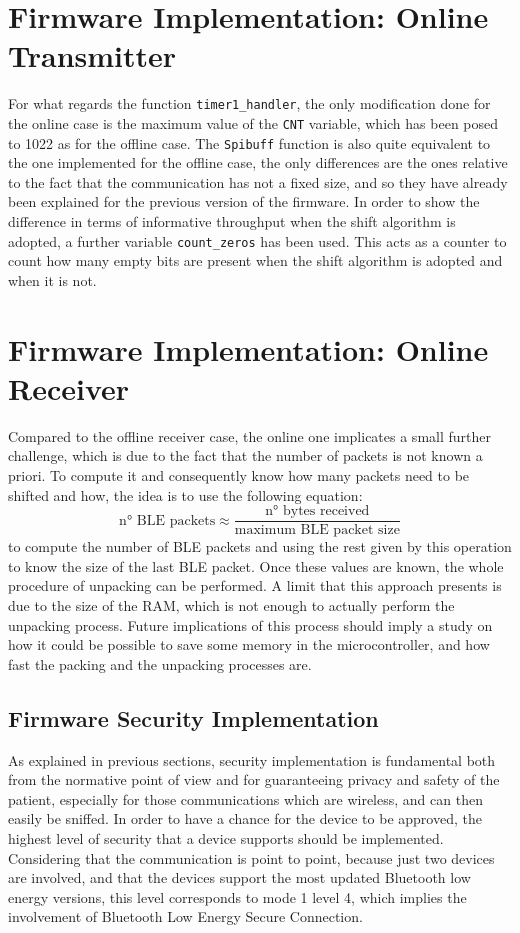 \documentclass{Configuration_Files/PoliMi3i_thesis}
\begin{document}
\section{Firmware Implementation: Online Transmitter}

For what regards the function \texttt{timer1\_handler}, the only modification done for the online case is the maximum value of the \texttt{CNT} variable, which has been posed to 1022 as for the offline case. The \texttt{Spibuff} function is also quite equivalent to the one implemented for the offline case, the only differences are the ones relative to the fact that the communication has not a fixed size, and so they have already been explained for the previous version of the firmware. In order to show the difference in terms of informative throughput when the shift algorithm is adopted, a further variable \texttt{count\_zeros} has been used. This acts as a counter to count how many empty bits are present when the shift algorithm is adopted and when it is not.

\section{Firmware Implementation: Online Receiver}

Compared to the offline receiver case, the online one implicates a small further challenge, which is due to the fact that the number of packets is not known a priori. To compute it and consequently know how many packets need to be shifted and how, the idea is to use the following equation:
\[
\text{n° BLE packets} \approx \frac{\text{n° bytes received}}{\text{maximum BLE packet size}}
\]
to compute the number of BLE packets and using the rest given by this operation to know the size of the last BLE packet. Once these values are known, the whole procedure of unpacking can be performed.
A limit that this approach presents is due to the size of the RAM, which is not enough to actually perform the unpacking process. Future implications of this process should imply a study on how it could be possible to save some memory in the microcontroller, and how fast the packing and the unpacking processes are.


\subsection{Firmware Security Implementation}
As explained in previous sections, security implementation is fundamental both from the normative point of view and for guaranteeing privacy and safety of the patient, especially for those communications which are wireless, and can then easily be sniffed. In order to have a chance for the device to be approved, the highest level of security that a device supports should be implemented. Considering that the communication is point to point, because just two devices are involved, and that the devices support the most updated Bluetooth low energy versions, this level corresponds to mode 1 level 4, which implies the involvement of Bluetooth Low Energy Secure Connection.
\end{document}
